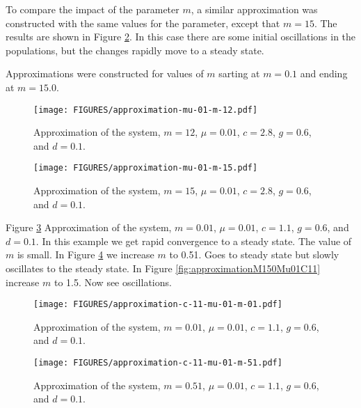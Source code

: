 \documentclass[review,authoryear]{elsarticle}
\begin{document}
To compare the impact of the parameter $m$, a similar approximation was
constructed with the same values for the parameter, except that $m=15$. 
The results are shown in Figure \ref{fig:approximationM15Mu01}. In this 
case there are some initial oscillations in the populations, but the 
changes rapidly move to a steady state.

Approximations were constructed for
values of $m$ sarting at $m=0.1$ and ending at $m=15.0$.


\begin{figure}[htb]
  \centering
  \texttt{[image: FIGURES/approximation-mu-01-m-12.pdf]}
  \caption[Approximation with $m=12$ and $\mu=0.01$.]{Approximation of
    the system, $m=12$, $\mu=0.01$, $c=2.8$, $g=0.6$, and $d=0.1$. }
  \label{fig:approximationM12Mu01}
\end{figure}

\begin{figure}[htb]
  \centering
  \texttt{[image: FIGURES/approximation-mu-01-m-15.pdf]}
  \caption[Approximation with $m=15$ and $\mu=0.01$.]{Approximation of
    the system, $m=15$, $\mu=0.01$, $c=2.8$, $g=0.6$, and $d=0.1$. }
  \label{fig:approximationM15Mu01}
\end{figure}

Figure \ref{fig:approximationM01Mu01C11} Approximation of
the system, $m=0.01$, $\mu=0.01$, $c=1.1$, $g=0.6$, and $d=0.1$.  
In this example we get rapid convergence to a steady state. The value of $m$ is small. In Figure \ref{fig:approximationM51Mu01C11} we increase $m$ to 0.51. 
Goes to steady state but slowly oscillates to the steady state.
In Figure \ref{fig:approximationM150Mu01C11} increase $m$ to 1.5.
Now see oscillations.

\begin{figure}[htb]
  \centering
  \texttt{[image: FIGURES/approximation-c-11-mu-01-m-01.pdf]}
  \caption[Approximation with $c=1.1$, $m=0.01$ and $\mu=0.01$.]{Approximation of
    the system, $m=0.01$, $\mu=0.01$, $c=1.1$, $g=0.6$, and $d=0.1$. }
  \label{fig:approximationM01Mu01C11}
\end{figure}

\begin{figure}[htb]
  \centering
  \texttt{[image: FIGURES/approximation-c-11-mu-01-m-51.pdf]}
  \caption[Approximation with $c=1.1$, $m=0.51$ and $\mu=0.01$.]{Approximation of
    the system, $m=0.51$, $\mu=0.01$, $c=1.1$, $g=0.6$, and $d=0.1$. }
  \label{fig:approximationM51Mu01C11}
\end{figure}
\end{document}
